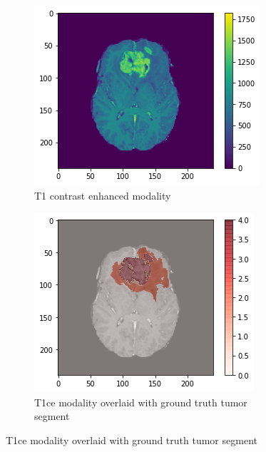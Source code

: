 \begin{figure}[H]
    \centering
    \begin{subfigure}[t]{.32\textwidth}
        \centering
        \includegraphics[width=\linewidth]{chapters/07_brats3d/images/02_t1ce.png}
        \caption{T1 contrast enhanced modality}
    \end{subfigure}\hfill%
    \begin{subfigure}[t]{.315\textwidth}
        \centering
        \includegraphics[width=\linewidth]{chapters/07_brats3d/images/06_t1ce_segment.png}
        \caption{T1ce modality overlaid with ground truth tumor segment}

\end{subfigure}
\end{figure}
